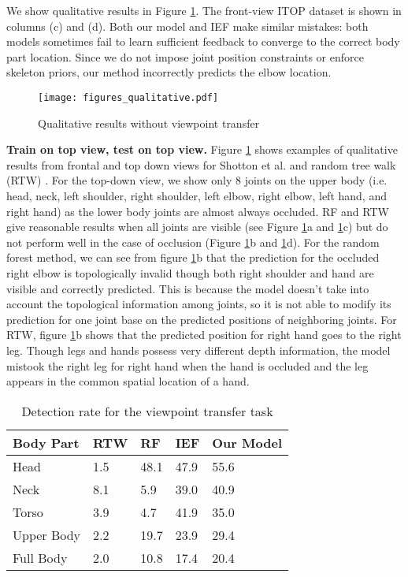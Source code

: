 \documentclass[runningheads]{llncs}
\begin{document}
	We show qualitative results in Figure \ref{fig:qualitative}. The front-view ITOP dataset is shown in columns (c) and (d). Both our model and IEF make similar mistakes: both models sometimes fail to learn sufficient feedback to converge to the correct body part location. Since we do not impose joint position constraints or enforce skeleton priors, our method incorrectly predicts the elbow location.

	\begin{figure}[t]
		\centering
		\hspace{-10mm}
		\texttt{[image: figures\_qualitative.pdf]}
		\caption{Qualitative results without viewpoint transfer}
		\label{fig:qualitative}
	\end{figure}


	\textbf{Train on top view, test on top view.}
	Figure \ref{fig:qualitative} shows examples of qualitative results from frontal and top down views for Shotton et al. \cite{shotton2011real} and random tree walk (RTW) \cite{yub2015random}. For the top-down view, we show only 8 joints on the upper body (i.e. head, neck, left shoulder, right shoulder, left elbow, right elbow, left hand, and right hand) as the lower body joints are almost always occluded. RF and RTW give reasonable results when all joints are visible (see Figure \ref{fig:qualitative}a and \ref{fig:qualitative}c) but do not perform well in the case of occlusion (Figure \ref{fig:qualitative}b and \ref{fig:qualitative}d). For the random forest method, we can see from figure \ref{fig:qualitative}b that the prediction for the occluded right elbow is topologically invalid though both right shoulder and hand are visible and correctly predicted. This is because the model doesn't take into account the topological information among joints, so it is not able to modify its prediction for one joint base on the predicted positions of neighboring joints. For RTW, figure \ref{fig:qualitative}b shows that the predicted position for right hand goes to the right leg. Though legs and hands possess very different depth information, the model mistook the right leg for right hand when the hand is occluded and the leg appears in the common spatial location of a hand.

	\begin{table}[t]
		\centering
		\begin{tabular}{lC{1cm}C{1cm}C{1cm}C{2cm}}
			\hline
			Body Part   & RTW   & RF   & IEF  & Our Model \\ \hline
			Head        & 1.5 &	48.1 &	47.9 &	55.6 \\
			Neck        & 8.1 &	5.9	 &  39.0 &	40.9 \\
			Torso       & 3.9 &	4.7	 &  41.9 &	35.0 \\  \hline
			Upper Body  & 2.2 &	19.7 &	23.9 &	29.4 \\
			Full Body   & 2.0 &	10.8 &	17.4 &	20.4 \\ \hline
		\end{tabular}
		\caption{Detection rate for the viewpoint transfer task}
		\label{tab:transfer}
	\end{table}
\end{document}
